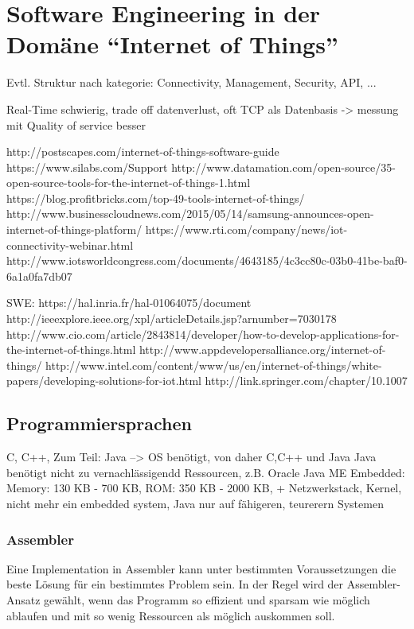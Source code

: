 \chapter{Software Engineering in der Domäne "`Internet of Things"'}


Evtl. Struktur nach kategorie: Connectivity, Management, Security, API, ...

Real-Time schwierig, trade off datenverlust, oft TCP als Datenbasis -> messung mit Quality of service besser

http://postscapes.com/internet-of-things-software-guide
https://www.silabs.com/Support%
http://www.datamation.com/open-source/35-open-source-tools-for-the-internet-of-things-1.html
https://blog.profitbricks.com/top-49-tools-internet-of-things/
http://www.businesscloudnews.com/2015/05/14/samsung-announces-open-internet-of-things-platform/
https://www.rti.com/company/news/iot-connectivity-webinar.html
http://www.iotsworldcongress.com/documents/4643185/4c3cc80c-03b0-41be-baf0-6a1a0fa7db07


SWE:
https://hal.inria.fr/hal-01064075/document
http://ieeexplore.ieee.org/xpl/articleDetails.jsp?arnumber=7030178
http://www.cio.com/article/2843814/developer/how-to-develop-applications-for-the-internet-of-things.html
http://www.appdevelopersalliance.org/internet-of-things/
http://www.intel.com/content/www/us/en/internet-of-things/white-papers/developing-solutions-for-iot.html
http://link.springer.com/chapter/10.1007%

\section{Programmiersprachen}

C, C++, Zum Teil: Java --> OS benötigt, von daher C,C++ und Java
Java benötigt nicht zu vernachlässigendd Ressourcen, z.B. Oracle Java ME Embedded: Memory: 130 KB - 700 KB, ROM: 350 KB - 2000 KB, + Netzwerkstack, Kernel, nicht mehr ein embedded system, Java nur auf fähigeren, teurerern Systemen

\subsection{Assembler}
Eine Implementation in Assembler kann unter bestimmten Voraussetzungen die beste Lösung für ein bestimmtes Problem sein. In der Regel wird der Assembler-Ansatz gewählt, wenn das Programm so effizient und sparsam wie möglich ablaufen und mit so wenig Ressourcen als möglich auskommen soll.



